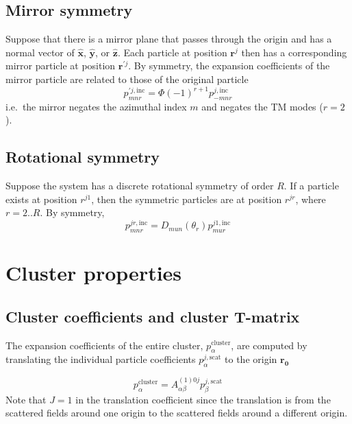 \documentclass[11pt]{article}
\begin{document}
\subsection{Mirror symmetry}
Suppose that there is a mirror plane that passes through the origin and has a normal vector of $\bm{\hat x}$, $\bm{\hat y}$, or $\bm{\hat z}$.
Each particle at position $\bm{r}^j$ then has a corresponding mirror particle at position $\bm{r}^{\prime j}$.
By symmetry, the expansion coefficients of the mirror particle are related to those of the original particle
\begin{equation}
    p^{\prime j,\text{inc}}_{mnr} = \Phi (-1)^{r+1} p^{j,\text{inc}}_{-mnr}
    \label{eqn:mirror_symmetry}
\end{equation}
i.e.\ the mirror negates the azimuthal index $m$ and negates the TM modes ($r=2$).

\subsection{Rotational symmetry}
Suppose the system has a discrete rotational symmetry of order $R$.
If a particle exists at position $r^{j1}$, then the symmetric particles are at position $r^{jr}$, where $r = 2..R$.
By symmetry,
\begin{equation}
    p^{jr,\text{inc}}_{mnr} = D_{mun}(\theta_r) p^{j1,\text{inc}}_{mur}
    \label{eqn:rotational_symmetry}
\end{equation}

\section{Cluster properties}

\subsection{Cluster coefficients and cluster T-matrix}
The expansion coefficients of the entire cluster, $p_{\alpha}^{\text{cluster}}$, are computed by translating the individual particle coefficients $p_{\alpha}^{j,\text{scat}}$ to the origin $\bm{r_0}$

\begin{equation}
    p_{\alpha}^{\text{cluster}} = 
    A_{\alpha \beta}^{(1)0j}
    p_{\beta}^{j,\text{scat}}
\label{eqn:cluster_coefficients}
\end{equation}
Note that $J=1$ in the translation coefficient since the translation is from the scattered fields around one origin to the scattered fields around a different origin.
\end{document}
